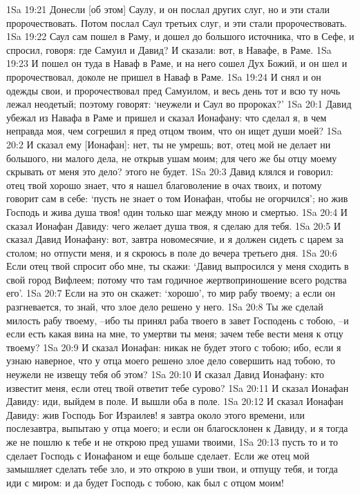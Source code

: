 1Sa 19:21  Донесли [об этом] Саулу, и он послал других слуг, но и эти стали пророчествовать. Потом послал Саул третьих слуг, и эти стали пророчествовать.
1Sa 19:22  Саул сам пошел в Раму, и дошел до большого источника, что в Сефе, и спросил, говоря: где Самуил и Давид? И сказали: вот, в Навафе, в Раме.
1Sa 19:23  И пошел он туда в Наваф в Раме, и на него сошел Дух Божий, и он шел и пророчествовал, доколе не пришел в Наваф в Раме.
1Sa 19:24  И снял и он одежды свои, и пророчествовал пред Самуилом, и весь день тот и всю ту ночь лежал неодетый; поэтому говорят: `неужели и Саул во пророках?'
1Sa 20:1  Давид убежал из Навафа в Раме и пришел и сказал Ионафану: что сделал я, в чем неправда моя, чем согрешил я пред отцом твоим, что он ищет души моей?
1Sa 20:2  И сказал ему [Ионафан]: нет, ты не умрешь; вот, отец мой не делает ни большого, ни малого дела, не открыв ушам моим; для чего же бы отцу моему скрывать от меня это дело? этого не будет.
1Sa 20:3  Давид клялся и говорил: отец твой хорошо знает, что я нашел благоволение в очах твоих, и потому говорит сам в себе: `пусть не знает о том Ионафан, чтобы не огорчился'; но жив Господь и жива душа твоя! один только шаг между мною и смертью.
1Sa 20:4  И сказал Ионафан Давиду: чего желает душа твоя, я сделаю для тебя.
1Sa 20:5  И сказал Давид Ионафану: вот, завтра новомесячие, и я должен сидеть с царем за столом; но отпусти меня, и я скроюсь в поле до вечера третьего дня.
1Sa 20:6  Если отец твой спросит обо мне, ты скажи: `Давид выпросился у меня сходить в свой город Вифлеем; потому что там годичное жертвоприношение всего родства его'.
1Sa 20:7  Если на это он скажет: `хорошо', то мир рабу твоему; а если он разгневается, то знай, что злое дело решено у него.
1Sa 20:8  Ты же сделай милость рабу твоему, --ибо ты принял раба твоего в завет Господень с тобою, --и если есть какая вина на мне, то умертви ты меня; зачем тебе вести меня к отцу твоему?
1Sa 20:9  И сказал Ионафан: никак не будет этого с тобою; ибо, если я узнаю наверное, что у отца моего решено злое дело совершить над тобою, то неужели не извещу тебя об этом?
1Sa 20:10  И сказал Давид Ионафану: кто известит меня, если отец твой ответит тебе сурово?
1Sa 20:11  И сказал Ионафан Давиду: иди, выйдем в поле. И вышли оба в поле.
1Sa 20:12  И сказал Ионафан Давиду: жив Господь Бог Израилев! я завтра около этого времени, или послезавтра, выпытаю у отца моего; и если он благосклонен к Давиду, и я тогда же не пошлю к тебе и не открою пред ушами твоими,
1Sa 20:13  пусть то и то сделает Господь с Ионафаном и еще больше сделает. Если же отец мой замышляет сделать тебе зло, и это открою в уши твои, и отпущу тебя, и тогда иди с миром: и да будет Господь с тобою, как был с отцом моим!
